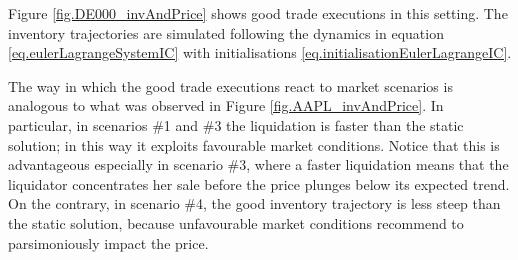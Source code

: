 \documentclass[10pt,a4paper]{article}
\begin{document}
	Figure \ref{fig.DE000_invAndPrice} shows good trade executions in this setting. The inventory trajectories are simulated following the dynamics in equation \eqref{eq.eulerLagrangeSystemIC} with initialisations \eqref{eq.initialisationEulerLagrangeIC}.
	
	The way in which the good trade executions react to market scenarios is analogous to what was observed in Figure \ref{fig.AAPL_invAndPrice}. In particular, in scenarios \#1 and \#3 the liquidation is faster than the static solution; in this way it exploits favourable market conditions. Notice that this is advantageous especially in scenario \#3, where a faster liquidation means that the liquidator concentrates her sale before the price plunges below its expected trend. On the contrary, in scenario \#4, the good inventory trajectory is less steep than the static solution, because unfavourable market conditions recommend to parsimoniously impact the price.  
	
	
	
\end{document}
